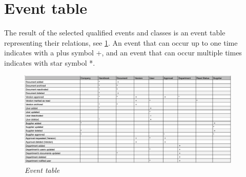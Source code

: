 \section{Event table}
The result of the selected qualified events and classes is an event table representing their relations, see \cref{fig:eventtable}. An event that can occur up to one time indicates with a plus symbol +, and an event that can occur multiple times indicates with star symbol *.

\begin{figure}[H]
	\centering
	\includegraphics[width=0.95\textwidth]{billeder/event_table.png}
	\caption{\textit{Event table
	}\label{fig:eventtable}}
\end{figure}


